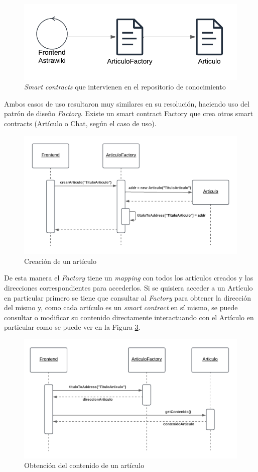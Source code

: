 \begin{figure}[H]
    \centering
    \includegraphics[width=0.5\linewidth]{img/astrawiki-articulo-factory.png}
    \caption{\textit{Smart contracts} que intervienen en el repositorio de conocimiento}
    \label{fig:aw-eth-articulo-factory}
\end{figure}

Ambos casos de uso resultaron muy similares en su resolución, haciendo uso del patrón de diseño \textit{Factory}. Existe un smart contract Factory que crea otros smart contracts (Artículo o Chat, según el caso de uso).

\begin{figure}[H]
    \centering
    \includegraphics[width=0.75\linewidth]{img/ds-aw-eth-crear-articulo.png}
    \caption{Creación de un artículo}
    \label{fig:ds-aw-eth-crear-articulo}
\end{figure}

De esta manera el \textit{Factory} tiene un \textit{mapping} con todos los artículos creados y las direcciones correspondientes para accederlos. Si se quisiera acceder a un Artículo en particular primero se tiene que consultar al \textit{Factory} para obtener la dirección del mismo y, como cada artículo es un \textit{smart contract} en sí mismo, se puede consultar o modificar su contenido directamente interactuando con el Artículo en particular como se puede ver en la Figura \ref{fig:ds-aw-eth-obtener-contenido-articulo}.

\begin{figure}[H]
    \centering
    \includegraphics[width=0.75\linewidth]{img/ds-aw-eth-obtener-contenido-articulo.png}
    \caption{Obtención del contenido de un artículo}
    \label{fig:ds-aw-eth-obtener-contenido-articulo}
\end{figure}

